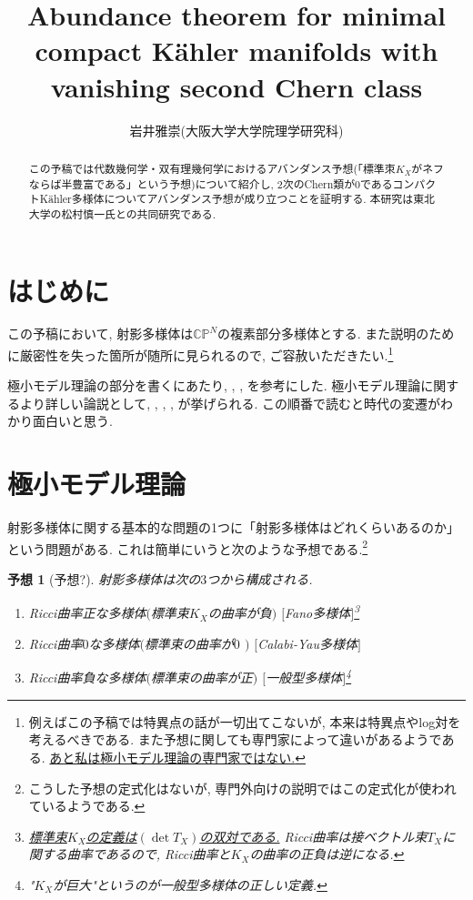 \documentclass[12pt]{amsart}
\title[]{Abundance theorem for minimal compact K\"ahler manifolds with vanishing second Chern class}
\author[]{岩井雅崇(大阪大学大学院理学研究科)}
\newtheorem{conj}[thm]{予想}
\theoremstyle{definition}
\theoremstyle{remark}
\newcommand{\C}{\mathbb{C}}
\begin{document}
\pagestyle{empty}

\maketitle
\thispagestyle{empty} 
%
\begin{abstract}
この予稿では代数幾何学・双有理幾何学におけるアバンダンス予想(「標準朿$K_X$がネフならば半豊富である」という予想)について紹介し, 2次のChern類が$0$であるコンパクトK\"ahler多様体についてアバンダンス予想が成り立つことを証明する. 本研究は東北大学の松村慎一氏との共同研究である.


\end{abstract}
\setcounter{tocdepth}{1}\tableofcontents
\setcounter{section}{-1}\section{はじめに}

この予稿において, 射影多様体は$\C \mathbb{P}^N$の複素部分多様体とする.
また説明のために厳密性を失った箇所が随所に見られるので, ご容赦いただきたい.\footnote{例えばこの予稿では特異点の話が一切出てこないが, 本来は特異点やlog対を考えるべきである. また予想に関しても専門家によって違いがあるようである. \underline{あと私は極小モデル理論の専門家ではない.} }

極小モデル理論の部分を書くにあたり, \cite{KMM87}, \cite{KM98}, \cite{Fjn22}を参考にした. 極小モデル理論に関するより詳しい論説として, \cite{Kaw93}, \cite{Fjn09}, \cite{Gon20}, \cite{Fjn22}が挙げられる. この順番で読むと時代の変遷がわかり面白いと思う.

\section{極小モデル理論}
射影多様体に関する基本的な問題の1つに「射影多様体はどれくらいあるのか」という問題がある. 
これは簡単にいうと次のような予想である.\footnote{こうした予想の定式化はないが, 専門外向けの説明ではこの定式化が使われているようである.}

\begin{conj}[予想?]
\label{class}
射影多様体は次の$3$つから構成される.
 \begin{enumerate}
\renewcommand{\labelenumi}{$(\arabic{enumi})$.}
 \setlength{\parskip}{0cm} %
  \setlength{\itemsep}{0cm}
\item Ricci曲率正な多様体$($標準束$K_X$の曲率が負$)$ $[$Fano多様体$]$\footnote{\underline{標準束$K_X$の定義は$(\det T_X)$の双対である.} Ricci曲率は接ベクトル束$T_X$に関する曲率であるので, Ricci曲率と$K_X$の曲率の正負は逆になる.}
\item Ricci曲率$0$な多様体$($標準束の曲率が$0$ $)$ $[$Calabi-Yau多様体$]$
\item Ricci曲率負な多様体$($標準束の曲率が正$)$ $[$一般型多様体$]$\footnote{"$K_X$が巨大"というのが一般型多様体の正しい定義. }
\end{enumerate}
\end{conj}
\end{document}
